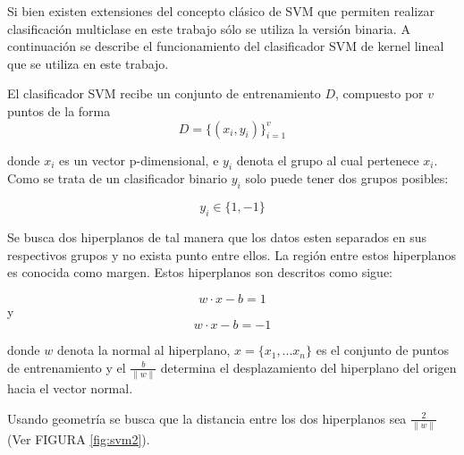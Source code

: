 Si bien existen extensiones del concepto clásico de SVM que permiten realizar clasificación multiclase \cite{lee2004multicategory,platt1998machines,keerthi2001improvements} en este trabajo sólo se utiliza la versión binaria. A continuación se describe el funcionamiento del clasificador SVM de kernel lineal que se utiliza en este trabajo.


El clasificador SVM  recibe un conjunto de entrenamiento  $D$, compuesto por $v$ puntos de la forma
\begin{equation} \label{eq:svm1}
D = \{ (x_i, y_i)\}_{i=1}^v
\end{equation}

donde $x_{i}$ es un vector p-dimensional, e $y_i$ denota el grupo al cual pertenece $x_{i}$. Como se trata de un clasificador binario $y_i$ solo puede tener dos grupos posibles:

\begin{equation} \label{eq:svm2}
y_i \in \{1,-1\}
\end{equation}

Se busca dos hiperplanos de tal manera que los datos esten separados en sus respectivos grupos y no exista punto entre ellos. La región entre estos hiperplanos es conocida como margen. Estos hiperplanos son descritos como sigue:

\begin{equation} \label{eq:svm4}
w\cdot x -b =1
\end{equation}
y 
\begin{equation} \label{eq:svm41}
w\cdot x -b =-1
\end{equation}

donde $w$ denota la normal al hiperplano, $x=\{x_1,...x_n\}$ es el conjunto de puntos de entrenamiento y el $\frac{b}{\left \| w \right \|}$ determina el desplazamiento del hiperplano del origen hacia el vector normal.


Usando geometría se busca que la distancia entre los dos hiperplanos sea $\frac{2}{\left \| w \right \|}$ (Ver FIGURA \ref{fig:svm2}). 


